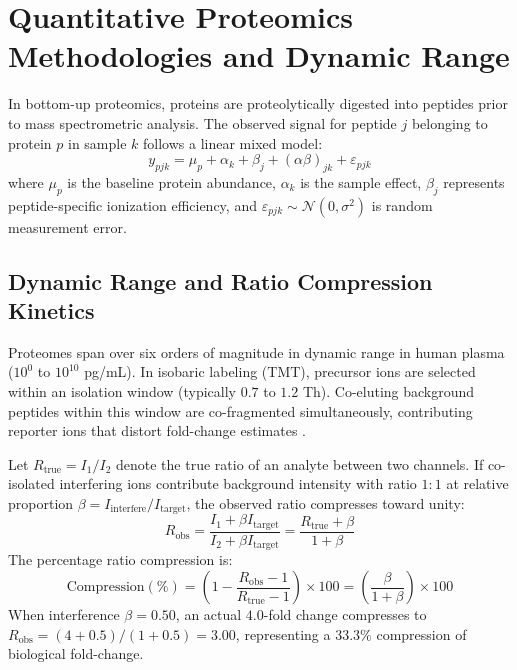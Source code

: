 \documentclass[11pt,twoside,openright]{book}
\begin{document}
\FloatBarrier
\section{Quantitative Proteomics Methodologies and Dynamic Range}
\label{sec:quant_methodologies}

In bottom-up proteomics, proteins are proteolytically digested into peptides prior to mass spectrometric analysis. The observed signal for peptide $j$ belonging to protein $p$ in sample $k$ follows a linear mixed model:
\begin{equation}
y_{pjk} = \mu_p + \alpha_k + \beta_j + (\alpha\beta)_{jk} + \varepsilon_{pjk}
\label{eq:peptide_linear_model}
\end{equation}
where $\mu_p$ is the baseline protein abundance, $\alpha_k$ is the sample effect, $\beta_j$ represents peptide-specific ionization efficiency, and $\varepsilon_{pjk} \sim \mathcal{N}(0, \sigma^2)$ is random measurement error.

\subsection{Dynamic Range and Ratio Compression Kinetics}

Proteomes span over six orders of magnitude in dynamic range in human plasma ($10^0$ to $10^{10}$ pg/mL). In isobaric labeling (TMT), precursor ions are selected within an isolation window (typically $0.7$ to $1.2$ Th). Co-eluting background peptides within this window are co-fragmented simultaneously, contributing reporter ions that distort fold-change estimates \cite{ting2011sps, savitski2013tmt}.

Let $R_{\text{true}} = I_1 / I_2$ denote the true ratio of an analyte between two channels. If co-isolated interfering ions contribute background intensity with ratio $1:1$ at relative proportion $\beta = I_{\text{interfere}} / I_{\text{target}}$, the observed ratio compresses toward unity:
\begin{equation}
R_{\text{obs}} = \frac{I_{1} + \beta I_{\text{target}}}{I_{2} + \beta I_{\text{target}}} = \frac{R_{\text{true}} + \beta}{1 + \beta}
\label{eq:ratio_compression}
\end{equation}
The percentage ratio compression is:
\begin{equation}
\text{Compression}(\%) = \left( 1 - \frac{R_{\text{obs}} - 1}{R_{\text{true}} - 1} \right) \times 100 = \left( \frac{\beta}{1 + \beta} \right) \times 100
\label{eq:compression_pct}
\end{equation}
When interference $\beta = 0.50$, an actual $4.0$-fold change compresses to $R_{\text{obs}} = (4 + 0.5)/(1 + 0.5) = 3.00$, representing a $33.3\%$ compression of biological fold-change.
\end{document}

